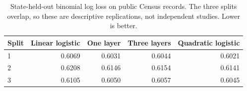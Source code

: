 \begin{table}[H]
\centering
\small
\caption{State-held-out binomial log loss on public Census records. The three splits overlap, so these are descriptive replications, not independent studies. Lower is better.}
\label{tab:real-neural}
\begin{tabular}{lrrrr}
\toprule
Split & Linear logistic & One layer & Three layers & Quadratic logistic \\
\midrule
1 & 0.6069 & 0.6031 & 0.6044 & 0.6021 \\
2 & 0.6208 & 0.6146 & 0.6154 & 0.6141 \\
3 & 0.6105 & 0.6050 & 0.6057 & 0.6045 \\
\bottomrule
\end{tabular}
\end{table}
